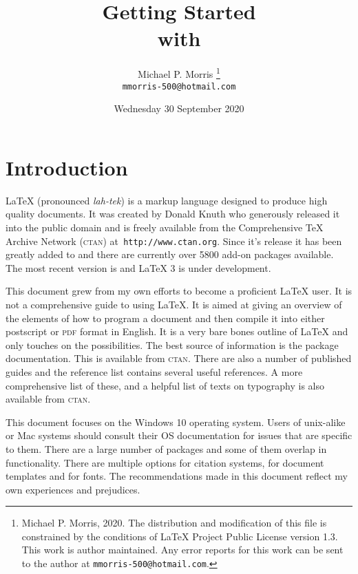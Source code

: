 \documentclass[a4paper]{article}
\title{Getting Started  \\ with \\ \LaTeXe}
\author{Michael P. Morris \footnote { \textcopyright Michael P. Morris, 2020. The distribution and modification of this file is constrained by the conditions of LaTeX Project Public License version 1.3. This work is author maintained. Any error reports for this work can be sent to the author at \texttt{mmorris-500@hotmail.com}.} \\ 
	\texttt{{\footnotesize mmorris-500@hotmail.com}}}
\date{Wednesday 30 September 2020}
\begin{document}
\maketitle




\tableofcontents

\clearpage

\listoffigures

\clearpage

\listoftables

\clearpage


\section{Introduction}

LaTeX (pronounced \emph{lah-tek}) is a markup language designed to produce high quality documents. It was created by Donald Knuth who generously released it into the public domain and is freely available from the Comprehensive TeX Archive Network (\textsc{ctan}) at\texttt{ http://www.ctan.org}. Since it’s release it has been greatly added to and there are currently over 5800 add-on packages available. The most recent version is \LaTeXe and LaTeX 3 is under development. 

This document grew from my own efforts to become a proficient LaTeX user. It is not a comprehensive guide to using LaTeX. It is aimed at giving an overview of the elements of how to program a document and then compile it into either postscript or \textsc{pdf} format in English. It is a very bare bones outline of LaTeX and only touches on the possibilities. The best source of information is the package documentation. This is available from \textsc{ctan}. There are also a number of published guides and the reference list contains several useful references. A more comprehensive list of these, and a helpful list of texts on typography is also available from \textsc{ctan}. 

This document focuses on the Windows 10 operating system. Users of unix-alike or Mac systems should consult their OS documentation for issues that are specific to them. There are a large number of packages and some of them overlap in functionality. There are multiple options for citation systems, for document templates and for fonts. The recommendations made in this document reflect my own experiences and prejudices.
\end{document}
